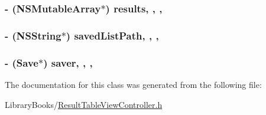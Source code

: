 \subsubsection[{results}]{\setlength{\rightskip}{0pt plus 5cm}-\/ (N\+S\+Mutable\+Array$\ast$) results\hspace{0.3cm}{\ttfamily [read]}, {\ttfamily [write]}, {\ttfamily [nonatomic]}, {\ttfamily [strong]}}\label{interface_result_table_view_controller_aac9b268204aac1044dc8e7dbe2927409}
\hypertarget{interface_result_table_view_controller_a3bc64243af0d4d0b1ac9e4b4ce219a97}{}
\subsubsection[{saved\+List\+Path}]{\setlength{\rightskip}{0pt plus 5cm}-\/ (N\+S\+String$\ast$) saved\+List\+Path\hspace{0.3cm}{\ttfamily [read]}, {\ttfamily [write]}, {\ttfamily [nonatomic]}, {\ttfamily [strong]}}\label{interface_result_table_view_controller_a3bc64243af0d4d0b1ac9e4b4ce219a97}
\hypertarget{interface_result_table_view_controller_af56b1c31e591ad111fa3558a48e3fe6e}{}
\subsubsection[{saver}]{\setlength{\rightskip}{0pt plus 5cm}-\/ ({\bf Save}$\ast$) saver\hspace{0.3cm}{\ttfamily [read]}, {\ttfamily [write]}, {\ttfamily [atomic]}, {\ttfamily [strong]}}\label{interface_result_table_view_controller_af56b1c31e591ad111fa3558a48e3fe6e}


The documentation for this class was generated from the following file\+:\begin{DoxyCompactItemize}
\item 
Library\+Books/\hyperlink{_result_table_view_controller_8h}{Result\+Table\+View\+Controller.\+h}\end{DoxyCompactItemize}
